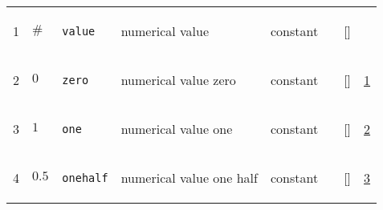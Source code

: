 \begin{longtable}{|p{1cm}|p{3cm}|p{3cm}|p{7cm}|p{3.0cm}|p{3cm}|p{2cm}|p{1cm}|}
                 \\
    1
             & \hypertarget{"v:1"}{ $ {\#}{_{}} $}
             & \verb|value|
             & numerical value
             & \begin{lay}constant \end{lay}
             & $  $
             & []
             & \\
    2
             & \hypertarget{"v:2"}{ $ {0}{_{}} $}
             & \verb|zero|
             & numerical value zero
             & \begin{lay}constant \end{lay}
             & $  $
             & []
             & \hyperlink{"e:1"}{ 1 }
                 \\
    3
             & \hypertarget{"v:3"}{ $ {1}{_{}} $}
             & \verb|one|
             & numerical value one
             & \begin{lay}constant \end{lay}
             & $  $
             & []
             & \hyperlink{"e:2"}{ 2 }
                 \\
    4
             & \hypertarget{"v:4"}{ $ {0.5}{_{}} $}
             & \verb|onehalf|
             & numerical value one half
             & \begin{lay}constant \end{lay}
             & $  $
             & []
             & \hyperlink{"e:3"}{ 3 }
                 \\
    \end{longtable}